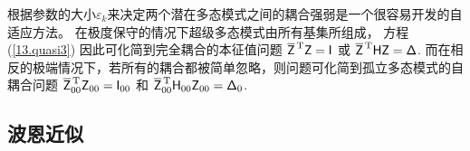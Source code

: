 {{{{%

根据参数的大小$\varepsilon_k$来决定两个潜在多态模式之间的耦合强弱是一个很容易开发的自适应方法。
在极度保守的情况下超级多态模式由所有基集所组成，
方程(\ref{13.quasi3}) \vspace{-0.4 mm}因此可化简到完全耦合的本征值问题
$\overline{\ssZ}^{\hspace{0.5 mm}
\raisebox{-0.4 ex}{\scriptsize\rm T}}\ssZ=\ssI$ 
或
$\overline{\ssZ}^{\hspace{0.5 mm}
\raisebox{-0.4 ex}{\scriptsize\rm T}}\ssH\ssZ=\ssDelta$.
而在相反的极端情况下，若所有的耦合都被简单忽略，则问题可化简到孤立多态模式的自耦合问题
$\overline{\ssZ}_{00}^{\hspace{0.5 mm}
\raisebox{-0.4 ex}{\scriptsize\rm T}}\ssZ_{00}=\ssI_{00}$ 
和
$\overline{\ssZ}_{00}^{\hspace{0.5 mm}
\raisebox{-0.4 ex}{\scriptsize\rm T}}\ssH_{00}\ssZ_{00}=\ssDelta_0$.

%
%
%

\subsection{波恩近似}
%
\label{13.sec.Born}

}}}}
